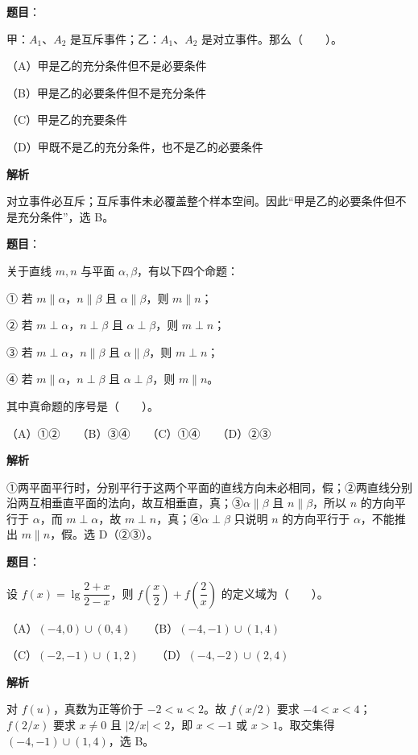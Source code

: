 \begin{answer}

\textbf{题目}：

甲：$A_1\text{、}A_2$ 是互斥事件；乙：$A_1\text{、}A_2$ 是对立事件。那么\mbox{（　　）}。

（A）甲是乙的充分条件但不是必要条件

（B）甲是乙的必要条件但不是充分条件

（C）甲是乙的充要条件

（D）甲既不是乙的充分条件，也不是乙的必要条件

\textbf{解析}

对立事件必互斥；互斥事件未必覆盖整个样本空间。因此“甲是乙的必要条件但不是充分条件”，选 B。


\end{answer}
\begin{answer}

\textbf{题目}：

关于直线 $m,n$ 与平面 $\alpha,\beta$，有以下四个命题：

① 若 $m\parallel\alpha$，$n\parallel\beta$ 且 $\alpha\parallel\beta$，则 $m\parallel n$；

② 若 $m\perp\alpha$，$n\perp\beta$ 且 $\alpha\perp\beta$，则 $m\perp n$；

③ 若 $m\perp\alpha$，$n\parallel\beta$ 且 $\alpha\parallel\beta$，则 $m\perp n$；

④ 若 $m\parallel\alpha$，$n\perp\beta$ 且 $\alpha\perp\beta$，则 $m\parallel n$。

其中真命题的序号是\mbox{（　　）}。

（A）①②　　（B）③④　　（C）①④　　（D）②③

\textbf{解析}

①两平面平行时，分别平行于这两个平面的直线方向未必相同，假；②两直线分别沿两互相垂直平面的法向，故互相垂直，真；③$\alpha\parallel\beta$ 且 $n\parallel\beta$，所以 $n$ 的方向平行于 $\alpha$，而 $m\perp\alpha$，故 $m\perp n$，真；④$\alpha\perp\beta$ 只说明 $n$ 的方向平行于 $\alpha$，不能推出 $m\parallel n$，假。选 D（②③）。


\end{answer}
\begin{answer}

\textbf{题目}：

设 $f(x)=\lg\dfrac{2+x}{2-x}$，则 $f\left(\dfrac{x}{2}\right)+f\left(\dfrac{2}{x}\right)$ 的定义域为\mbox{（　　）}。

（A）$(-4,0)\cup(0,4)$　　（B）$(-4,-1)\cup(1,4)$

（C）$(-2,-1)\cup(1,2)$　　（D）$(-4,-2)\cup(2,4)$

\textbf{解析}

对 $f(u)$，真数为正等价于 $-2<u<2$。故 $f(x/2)$ 要求 $-4<x<4$；$f(2/x)$ 要求 $x\ne0$ 且 $|2/x|<2$，即 $x<-1$ 或 $x>1$。取交集得 $(-4,-1)\cup(1,4)$，选 B。


\end{answer}
